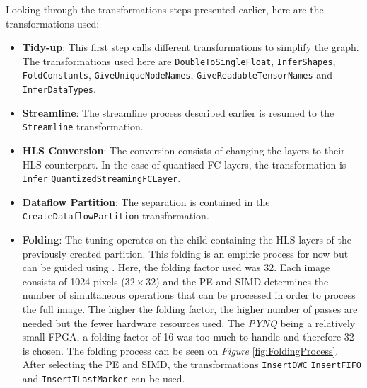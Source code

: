 Looking through the transformations steps presented earlier, here are the transformations used:
\begin{itemize}
  \item \textbf{Tidy-up}: This first step calls different transformations to simplify the graph. The transformations used here are \texttt{DoubleToSingleFloat}, \texttt{InferShapes}, \texttt{FoldConstants}, \texttt{GiveUniqueNodeNames}, \texttt{GiveReadableTensorNames} and \texttt{InferDataTypes}.
  \item \textbf{Streamline}: The streamline process described earlier is resumed to the \texttt{Streamline} transformation.
  \item \textbf{HLS Conversion}: The conversion consists of changing the layers to their HLS counterpart. In the case of quantised FC layers, the transformation is \texttt{Infer} \texttt{QuantizedStreamingFCLayer}.
  \item \textbf{Dataflow Partition}: The separation is contained in the \texttt{CreateDataflowPartition} transformation.
  \item \textbf{Folding}: The tuning operates on the child containing the HLS layers of the previously created partition. This folding is an empiric process for now but can be guided using . Here, the folding factor used was 32. Each image consists of 1024 pixels ($32 \times 32$) and the PE and SIMD determines the number of simultaneous operations that can be processed in order to process the full image. The higher the folding factor, the higher number of passes are needed but the fewer hardware resources used. The \emph{PYNQ} being a relatively small FPGA, a folding factor of 16 was too much to handle and therefore 32 is chosen. The folding process can be seen on \emph{Figure} \ref{fig:FoldingProcess}. After selecting the PE and SIMD, the transformations \texttt{InsertDWC} \texttt{InsertFIFO} and \texttt{InsertTLastMarker} can be used.


\end{itemize}
